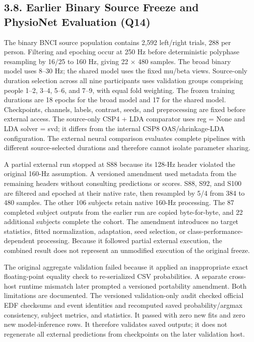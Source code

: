 \documentclass[11pt]{article}
\begin{document}
\subsection*{3.8. Earlier Binary Source Freeze and PhysioNet Evaluation (Q14)}
The binary BNCI source population contains 2,592 left/right trials, 288 per person. Filtering and epoching occur at 250 Hz before deterministic polyphase resampling by 16/25 to 160 Hz, giving 22 $\times$ 480 samples. The broad binary model uses 8--30 Hz; the shared model uses the fixed mu/beta views. Source-only duration selection across all nine participants uses validation groups comprising people 1--2, 3--4, 5--6, and 7--9, with equal fold weighting. The frozen training durations are 18 epochs for the broad model and 17 for the shared model. Checkpoints, channels, labels, contrast, seeds, and preprocessing are fixed before external access. The source-only CSP4 + LDA comparator uses reg = None and LDA solver = svd; it differs from the internal CSP8 OAS/shrinkage-LDA configuration. The external neural comparison evaluates complete pipelines with different source-selected durations and therefore cannot isolate parameter sharing.

A partial external run stopped at S88 because its 128-Hz header violated the original 160-Hz assumption. A versioned amendment used metadata from the remaining headers without consulting predictions or scores. S88, S92, and S100 are filtered and epoched at their native rate, then resampled by 5/4 from 384 to 480 samples. The other 106 subjects retain native 160-Hz processing. The 87 completed subject outputs from the earlier run are copied byte-for-byte, and 22 additional subjects complete the cohort. The amendment introduces no target statistics, fitted normalization, adaptation, seed selection, or class-performance-dependent processing. Because it followed partial external execution, the combined result does not represent an unmodified execution of the original freeze.

The original aggregate validation failed because it applied an inappropriate exact floating-point equality check to re-serialized CSV probabilities. A separate cross-host runtime mismatch later prompted a versioned portability amendment. Both limitations are documented. The versioned validation-only audit checked official EDF checksums and event identities and recomputed saved probability/argmax consistency, subject metrics, and statistics. It passed with zero new fits and zero new model-inference rows. It therefore validates saved outputs; it does not regenerate all external predictions from checkpoints on the later validation host.
\end{document}
